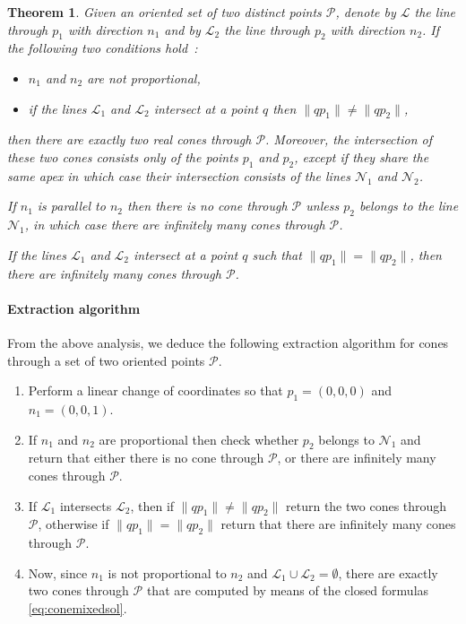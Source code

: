 \documentclass[5p]{elsarticle}
\newtheorem{thm}{Theorem}
\newcommand\Pc{\mathcal P}
\def\Lc{{\mathcal{L}}}
\def\Nc{{\mathcal{N}}}
\newcommand{\lb}[1]{{\color{black} #1}}
\begin{document}
\begin{thm} \lb{Given} an oriented set of two distinct points \lb{$\Pc$, denote} by $\Lc$ the line through $p_1$ with direction $n_1$ and by $\Lc_2$ the line through $p_2$ with direction $n_2$.
	If the \lb{following two} conditions \lb{hold~:}
	\begin{itemize}
		\item[i)] $n_1$ and $n_2$ are not proportional, 
		\item[ii)] if the lines $\Lc_1$ and $\Lc_2$ intersect at a point $q$ then $\|qp_1\|\neq \|qp_2\|$,
	\end{itemize}
then there are exactly two real cones through $\Pc$. Moreover, the intersection of these two cones consists only of the points $p_1$ and $p_2$, except if they share the same apex in which case their intersection consists of the lines $\Nc_1$ and $\Nc_2$.  
	
	If $n_1$ is parallel to $n_2$ then there is no cone through $\Pc$ unless $p_2$ belongs to the \lb{line} $\Nc_1$, in which case there are infinitely many cones through $\Pc$.
	
	If the lines $\Lc_1$ and $\Lc_2$ intersect at a point $q$ such that $\|qp_1\|=\|qp_2\|$, then there are infinitely many cones through $\Pc$.
\end{thm}


 
\paragraph{Extraction algorithm}

From the above analysis, we deduce the following extraction algorithm \lb{for cones} through a set of two oriented points $\Pc$.
\begin{enumerate}
	\item Perform a linear change of coordinates \lb{so that} $p_1=(0,0,0)$ and $n_1=(0,0,1)$. 
	\item If $n_1$ and $n_2$ are proportional then check \lb{whether} $p_2$ belongs to $\Nc_1$ and return that either there is no cone through $\Pc$, or there are infinitely many cones through $\Pc$.
	\item If $\Lc_1$ \lb{intersects} $\Lc_2$, then if $\|qp_1\|\neq \|qp_2\|$ return the two cones through $\Pc$, otherwise if $\|qp_1\|= \|qp_2\|$ return that there are infinitely many cones through $\Pc$. 
	\item Now, since $n_1$ is not proportional to $n_2$ and $\Lc_1\cup\Lc_2=\emptyset$, there are exactly two cones through $\Pc$ that are computed by means of the closed formulas \eqref{eq:conemixedsol}. 
\end{enumerate} 
\end{document}
